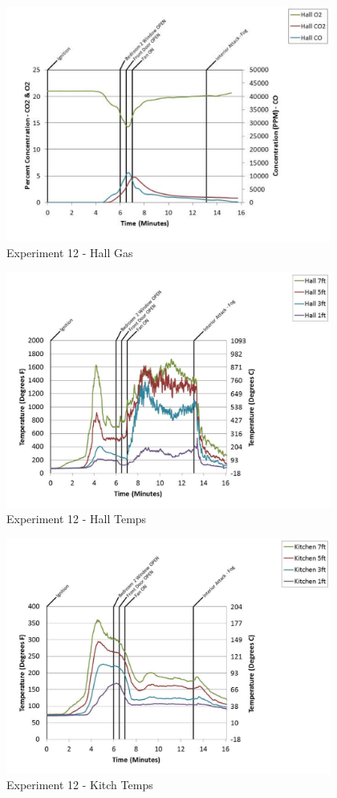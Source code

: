 \documentclass{article}
\begin{document}
\begin{appendices}
	\begin{figure}[h!]
		\centering
		\includegraphics[height=3.05in]{0_Images/Results_Charts/Exp_12_Charts/HallGas.pdf}
		\caption{Experiment 12 - Hall Gas}
	\end{figure}
 
	\clearpage

	\begin{figure}[h!]
		\centering
		\includegraphics[height=3.05in]{0_Images/Results_Charts/Exp_12_Charts/HallTemps.pdf}
		\caption{Experiment 12 - Hall Temps}
	\end{figure}
 

	\begin{figure}[h!]
		\centering
		\includegraphics[height=3.05in]{0_Images/Results_Charts/Exp_12_Charts/KitchTemps.pdf}
		\caption{Experiment 12 - Kitch Temps}
	\end{figure}
 

\end{appendices}
\end{document}
